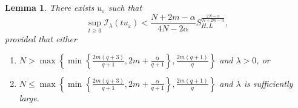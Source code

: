\documentclass[reqno]{amsart}
\newtheorem{lemma}[theorem]{Lemma}
\newcommand{\la} {\lambda}
\newcommand{\eps}{\varepsilon}
\newcommand{\al} {\alpha}
\newcommand{\mc} {\mathcal}
\numberwithin{theorem}{section} \numberwithin{equation}{section}
\begin{document}
\begin{lemma}\label{l5}
There exists $u_{\eps}$ such that
\[\sup _{t \geq 0} \mc{I_\la}(t u_\eps)<\frac{N+2m-\al}{4N-2\al} S_{H, L}^{\frac{2N-\al}{N+2m-\al}},\]
provided that either
\begin{enumerate}
\item  $N>\max \left\{\min \left\{\frac{2m(q+3)}{q+1}, 2m+\frac{\al}{q+1}\right\}, \frac{2m(q+1)}{q}\right\}$ and $\la>0$, or
\item  $N \leq \max \left\{\min \left\{\frac{2m(q+3)}{q+1}, 2m+\frac{\al}{q+1}\right\}, \frac{2m(q+1)}{q}\right\}$ and $\la$ is sufficiently large.
\end{enumerate}
\end{lemma}
\end{document}
